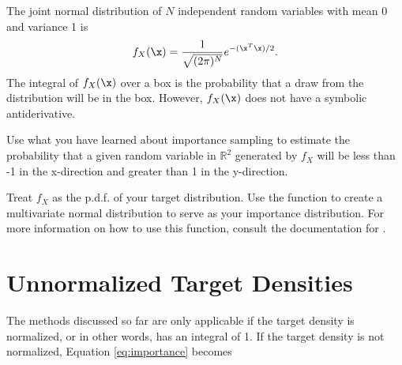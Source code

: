 \begin{problem}
The joint normal distribution of $N$ independent random variables with mean 0 and variance 1 is
\[
f_X(\x) = \frac{1}{\sqrt{(2 \pi)^N}} e^{-(\x^T\x)/2}.
\]
The integral of $f_X(\x)$ over a box is the probability that a draw from the distribution will be in the box.
However, $f_X(\x)$ does not have a symbolic antiderivative.

Use what you have learned about importance sampling to estimate the probability that a given random variable in $\mathbb{R}^2$ generated by $f_X$ will be less than -1 in the x-direction and greater than 1 in the y-direction.

Treat $f_X$ as the p.d.f. of your target distribution.
Use the function  to create a multivariate normal distribution to serve as your importance distribution. 
For more information on how to use this function, consult the documentation for 
.
\end{problem}

\section*{Unnormalized Target Densities}
The methods discussed so far are only applicable if the target density is normalized, or in other words, has an integral of 1. If the target density is not normalized, Equation \ref{eq:importance} becomes

